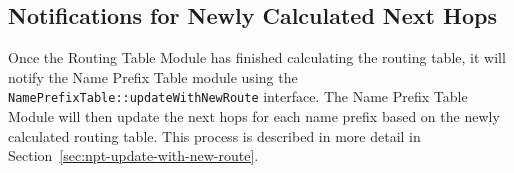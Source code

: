 \subsection{Notifications for Newly Calculated Next Hops}

Once the Routing Table Module has finished calculating the routing table, it will notify the Name Prefix Table module using the \texttt{NamePrefixTable::updateWithNewRoute} interface.
The Name Prefix Table Module will then update the next hops for each name prefix based on the newly calculated routing table.
This process is described in more detail in Section~\ref{sec:npt-update-with-new-route}.